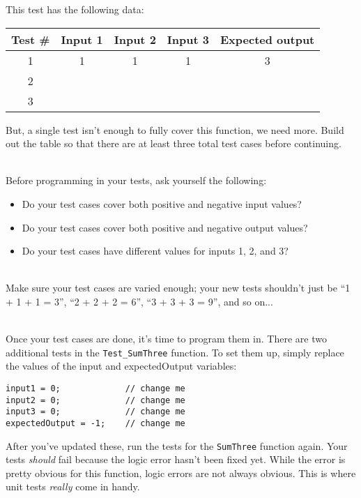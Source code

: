 This test has the following data:

\begin{center}
    \begin{tabular}{c | c c c | c}
        \textbf{Test \#} &
        \textbf{Input 1} &
        \textbf{Input 2} &
        \textbf{Input 3} &
        \textbf{Expected output}
        \\ \hline
        1 & 1 & 1 & 1 & 3
        \\ \hline
        2 & & & \\ \hline
        3 & & & \\ \hline
    \end{tabular}
\end{center}

But, a single test isn't enough to fully cover this function, we need more.
Build out the table so that there are at least three total test cases before continuing.

~\\

Before programming in your tests, ask yourself the following:

\begin{itemize}
    \item   Do your test cases cover both positive and negative input values?
    \item   Do your test cases cover both positive and negative output values?
    \item   Do your test cases have different values for inputs 1, 2, and 3?
\end{itemize}

~\\ Make sure your test cases are varied enough; your new tests shouldn't just be
``1 + 1 + 1 = 3'', ``2 + 2 + 2 = 6'', ``3 + 3 + 3 = 9'', and so on...

~\\

Once your test cases are done, it's time to program them in. There are two additional tests
in the \texttt{Test\_SumThree} function. To set them up, simply replace the values of the input and expectedOutput variables:

\begin{lstlisting}[style=code]
input1 = 0;             // change me
input2 = 0;             // change me
input3 = 0;             // change me
expectedOutput = -1;    // change me
\end{lstlisting}

After you've updated these, run the tests for the \texttt{SumThree} function again.
Your tests \textit{should} fail because the logic error hasn't been fixed yet. While the
error is pretty obvious for this function, logic errors are not always obvious. This is where
unit tests \textit{really} come in handy.
~\\

